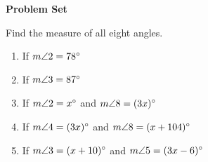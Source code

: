 \def\figdir{/storage/emulated/0/Documents/documents/latex/1920/Grade-8/3rd/properties-of-parallel-lines-cut-by-a-transversal/f}


\textbf{Problem Set}

\vspce

Find the measure of all eight angles. 
\begin{enumerate}[label = \arabic*. ]
\item \hspce If $m\angle{2} = 78 \degree $
\item \hspce If $m\angle{3} = 87 \degree $
\item \hspce If $m\angle{2} = x \degree $ and $m\angle{8} = (3x)  \degree $
\item \hspce If $m\angle{4} = (3x)\degree $ and $m\angle{8} = (x+104)  \degree $
\item \hspce If $m\angle{3} = (x+10) \degree $ and $m\angle{5} = (3x-6)  \degree $
\hspace*{12ex}\vspace*{-12ex}
\vspace*{10ex}
\end{enumerate}  

%

